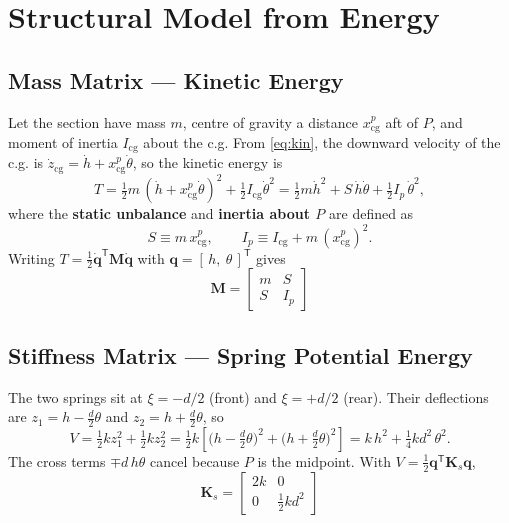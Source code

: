 \documentclass[
	a4paper, %
	10pt, %
]{CSUniSchoolLabReport}
\begin{document}
\section{Structural Model from Energy}\label{sec:struct-model}

\subsection{Mass Matrix --- Kinetic Energy}
Let the section have mass \(m\), centre of gravity a distance \(x_{\mathrm{cg}}^p\) aft
of \(P\), and moment of inertia \(I_{\mathrm{cg}}\) about the c.g. From \eqref{eq:kin}, the
downward velocity of the c.g. is \(\dot z_{\mathrm{cg}}=\dot h + x_{\mathrm{cg}}^p\dot\theta\),
so the kinetic energy is
\begin{equation}
    T = \tfrac12 m\,(\dot h + x_{\mathrm{cg}}^p\dot\theta)^2 + \tfrac12 I_{\mathrm{cg}}\dot\theta^2
    = \tfrac12 m\dot h^2 + S\,\dot h\dot\theta + \tfrac12 I_p\,\dot\theta^2 ,
    \label{eq:T}
\end{equation}
where the \textbf{static unbalance} and \textbf{inertia about \(P\)} are defined as
\begin{equation}
    S \equiv m\,x_{\mathrm{cg}}^p, \qquad I_p \equiv I_{\mathrm{cg}} + m\,({x_{\mathrm{cg}}^p})^2 .
\end{equation}
Writing \(T=\tfrac12\dot{\mathbf q}^{\mathsf T}\mathbf M\dot{\mathbf q}\) with
\(\mathbf q=[\,h,\ \theta\,]^{\mathsf T}\) gives
\begin{equation}
    \boxed{\;\mathbf M=\begin{bmatrix} m & S\\[2pt] S & I_p \end{bmatrix}\;}
    \label{eq:M}
\end{equation}

\subsection{Stiffness Matrix --- Spring Potential Energy}
The two springs sit at \(\xi=-d/2\) (front) and \(\xi=+d/2\) (rear). Their deflections are
\(z_{1}=h-\tfrac{d}{2}\theta\) and \(z_{2}=h+\tfrac{d}{2}\theta\), so
\begin{equation}
    V=\tfrac12 k z_1^2+\tfrac12 k z_2^2
    =\tfrac12 k\!\left[\Big(h-\tfrac d2\theta\Big)^2+\Big(h+\tfrac d2\theta\Big)^2\right]
    = k\,h^2+\tfrac14 k d^2\,\theta^2 .
    \label{eq:V}
\end{equation}
The cross terms \(\mp d\,h\theta\) cancel because \(P\) is the midpoint. With
\(V=\tfrac12\mathbf q^{\mathsf T}\mathbf K_s\mathbf q\),
\begin{equation}
    \boxed{\;\mathbf K_s=\begin{bmatrix} 2k & 0\\[2pt] 0 & \tfrac12 k d^2 \end{bmatrix}\;}
    \label{eq:Ks}
\end{equation}
\end{document}
